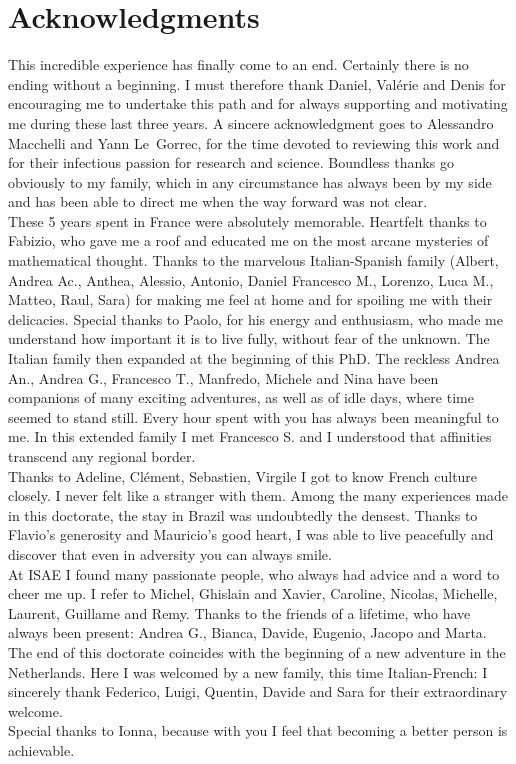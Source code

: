 \chapter*{Acknowledgments}


This incredible experience has finally come to an end. Certainly there is no ending without a beginning. I must therefore thank Daniel, Valérie and Denis for encouraging me to undertake this path and for always supporting and motivating me during these last three years. A sincere acknowledgment goes to Alessandro Macchelli and Yann Le~Gorrec, for the time devoted to reviewing this work and for their infectious passion for research and science. Boundless thanks go obviously to my family, which in any circumstance has always been by my side and has been able to direct me when the way forward was not clear. \\

These 5 years spent in France were absolutely memorable. Heartfelt thanks to Fabizio, who gave me a roof and educated me on the most arcane mysteries of mathematical thought. Thanks to the marvelous Italian-Spanish family (Albert, Andrea Ac., Anthea, Alessio, Antonio, Daniel Francesco M., Lorenzo, Luca M., Matteo, Raul, Sara) for making me feel at home and for spoiling me with their delicacies. Special thanks to Paolo, for his energy and enthusiasm, who made me understand how important it is to live fully, without fear of the unknown. The Italian family then expanded at the beginning of this PhD. The reckless Andrea An., Andrea G., Francesco T., Manfredo, Michele and Nina have been companions of many exciting adventures, as well as of idle days, where time seemed to stand still. Every hour spent with you has always been meaningful to me. In this extended family I met Francesco S. and I understood that affinities transcend any regional border. \\

Thanks to Adeline, Clément, Sebastien, Virgile I got to know French culture closely. I never felt like a stranger with them. Among the many experiences made in this doctorate, the stay in Brazil was undoubtedly the densest. Thanks to Flavio's generosity and Mauricio's good heart, I was able to live peacefully and discover that even in adversity you can always smile. \\

At ISAE I found many passionate people, who always had advice and a word to cheer me up. I refer to Michel, Ghislain and Xavier, Caroline, Nicolas, Michelle, Laurent, Guillame and Remy. Thanks to the friends of a lifetime, who have always been present: Andrea G., Bianca, Davide, Eugenio, Jacopo and Marta. \\

The end of this doctorate coincides with the beginning of a new adventure in the Netherlands. Here I was welcomed by a new family, this time Italian-French: I sincerely thank Federico, Luigi, Quentin, Davide and Sara for their extraordinary welcome.\\

Special thanks to Ionna, because with you I feel that becoming a better person is achievable.